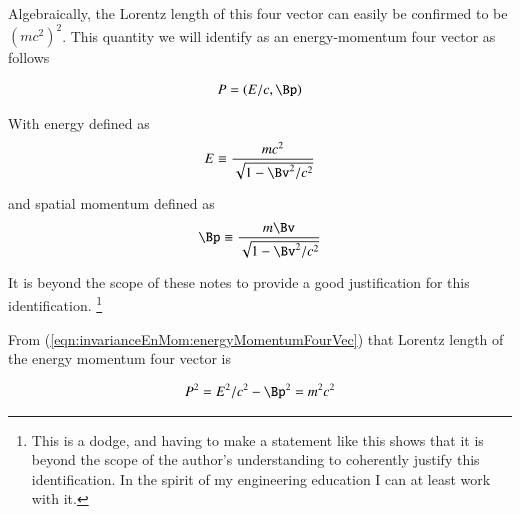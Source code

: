 \documentclass{article}
\begin{document}
Algebraically, the Lorentz length of this four vector can easily be confirmed to be $(m c^2)^2$.  This quantity 
we will identify as an energy-momentum four vector as follows

\begin{align}\label{eqn:invarianceEnMom:energyMomentumFourVec}
P = (E/c, \Bp)
\end{align}

With energy defined as
\begin{align}
E \equiv \frac{m c^2}{\sqrt{1 - \Bv^2/c^2}}
\end{align}

and spatial momentum defined as
\begin{align}
\Bp \equiv \frac{m \Bv}{\sqrt{1 - \Bv^2/c^2}}
\end{align}

It is beyond the scope of these notes to provide a good justification for this identification.
\footnote{This is a dodge, and having to make a statement like this shows that it is beyond the scope of the author's understanding to coherently justify this identification.  In the spirit of my engineering education I can at least work with it.}

From (\ref{eqn:invarianceEnMom:energyMomentumFourVec}) that Lorentz length of the
energy momentum four vector is

\begin{align}
P^2 = E^2/c^2 - \Bp^2 = m^2 c^2
\end{align}



\end{document}
